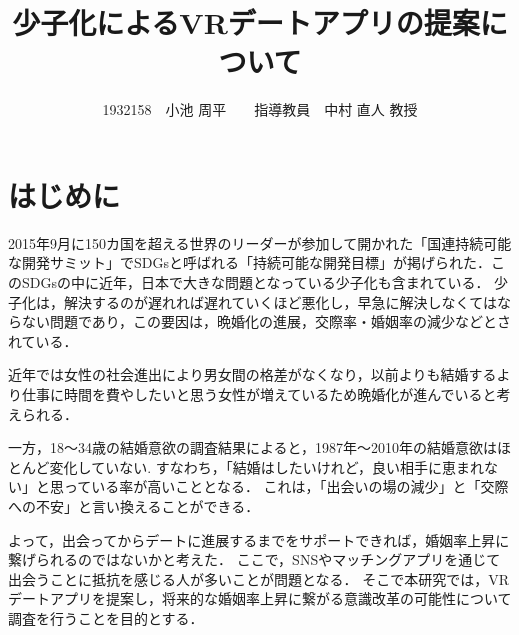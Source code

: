 \documentclass[12pt]{ltjsarticle}
\title{少子化によるVRデートアプリの提案について}
\author{1932158　小池 周平　　指導教員　中村 直人 教授}
\begin{document}
\maketitle

\section{はじめに}



2015年9月に150カ国を超える世界のリーダーが参加して開かれた「国連持続可能な開発サミット」でSDGsと呼ばれる「持続可能な開発目標」が掲げられた．このSDGsの中に近年，日本で大きな問題となっている少子化も含まれている．
少子化は，解決するのが遅れれば遅れていくほど悪化し，早急に解決しなくてはならない問題であり，この要因は，晩婚化の進展，交際率・婚姻率の減少などとされている．


近年では女性の社会進出により男女間の格差がなくなり，以前よりも結婚するより仕事に時間を費やしたいと思う女性が増えているため晩婚化が進んでいると考えられる\cite{sasaki2012}．

一方，18〜34歳の結婚意欲の調査結果によると，1987年〜2010年の結婚意欲はほとんど変化していない.
すなわち，「結婚はしたいけれど，良い相手に恵まれない」と思っている率が高いこととなる\cite{naikakufu2019}．
これは，「出会いの場の減少」と「交際への不安」と言い換えることができる．

よって，出会ってからデートに進展するまでをサポートできれば，婚姻率上昇に繋げられるのではないかと考えた．
ここで，SNSやマッチングアプリを通じて出会うことに抵抗を感じる人が多いことが問題となる．
そこで本研究では，VRデートアプリを提案し，将来的な婚姻率上昇に繋がる意識改革の可能性について調査を行うことを目的とする．
\end{document}

